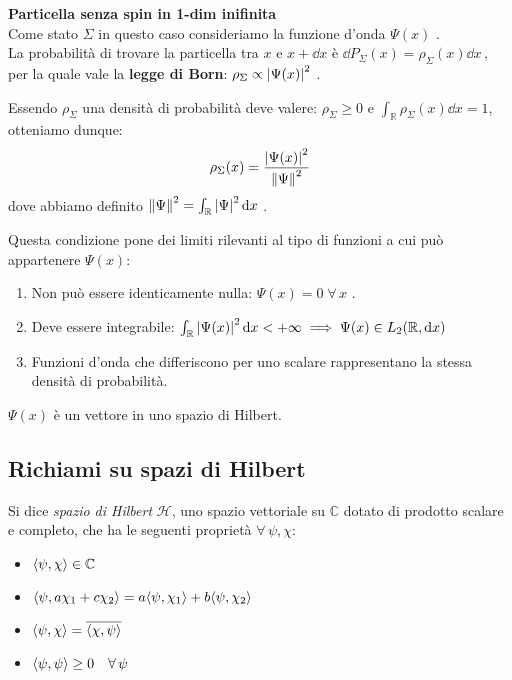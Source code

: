 \begin{example}
    \textbf{Particella senza spin in 1-dim inifinita}\\
    Come stato \(\Sigma\) in questo caso consideriamo la funzione d'onda \(\Psi(x)\) . \\
    La probabilità di trovare la particella tra  \(x\)  e  \(x+\dd{x}\)  è  \(\dd{P_\Sigma}(x)= \rho_\Sigma(x)\dd{x}\,\), 
    per la quale vale la \textbf{legge di Born}: \(\rho_\Sigma\propto \abs{\Psi(x)}^2\) .

    Essendo \(\rho_\Sigma\) una densità di probabilità deve valere: \(\rho_\Sigma \geq 0 \) e \(\int_\mathbb{R} \rho_\Sigma(x) \dd{x}= 1\), otteniamo dunque:
    \begin{equation}
        \rho_\Sigma(x) = \frac{\abs{\Psi(x)}^2}{\norm{\Psi}^2} 
    \end{equation}
    dove abbiamo definito \(\norm{\Psi}^2 = \int_\mathbb{R}\abs{\Psi}^2 \dd{x}\) .

    Questa condizione pone dei limiti rilevanti al tipo di funzioni a cui può appartenere \(\Psi(x)\):
    \begin{enumerate}
        \item Non può essere identicamente nulla: \(\Psi(x)= 0 \;\forall \, x\) .
        \item Deve essere integrabile: \(\int_\mathbb{R} \abs{\Psi(x)}^2 \dd{x} < + \infty \implies \Psi(x) \in L_2(\mathbb{R}, \dd{x})\)
        \item Funzioni d'onda che differiscono per uno scalare rappresentano la stessa densità di probabilità.
    \end{enumerate}
    
    \begin{remark}
        \(\Psi(x)\) è un vettore in uno spazio di Hilbert.
    \end{remark}
\end{example}



\subsection{Richiami su spazi di Hilbert}
Si dice \textit{spazio di Hilbert} \(\mathcal{H}\), uno spazio vettoriale su \(\mathbb{C}\) dotato di prodotto scalare e completo, 
che ha le seguenti proprietà \(\forall \,\psi,\chi\):
\begin{itemize}
    \item \( \langle \psi, \chi \rangle \in \mathbb{C}\)
    \item \(\langle \psi, a\chi_1+c\chi_2 \rangle= a\langle \psi, \chi_1 \rangle+b\langle \psi, \chi_2 \rangle\)
    \item \(\langle \psi, \chi \rangle= \overline{\langle \chi, \psi \rangle}\)
    \item \(\langle \psi, \psi \rangle\geq 0\quad \forall \,\psi\)
\end{itemize}

